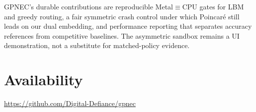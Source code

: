 \documentclass[11pt,a4paper]{article}
\begin{document}
GPNEC's durable contributions are reproducible Metal$\equiv$CPU gates for
LBM and greedy routing, a fair symmetric crash control under which
Poincar\'e still leads on our dual embedding, and performance reporting that
separates accuracy references from competitive baselines. The asymmetric
sandbox remains a UI demonstration, not a substitute for matched-policy
evidence.

\section*{Availability}
\url{https://github.com/Digital-Defiance/gpnec}



\end{document}
